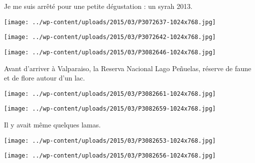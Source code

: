   Je me suis arrêté pour une petite dégustation : un syrah 2013.
\begin{center} \texttt{[image: ../wp-content/uploads/2015/03/P3072637-1024x768.jpg]} \end{center}
\begin{center} \texttt{[image: ../wp-content/uploads/2015/03/P3072642-1024x768.jpg]} \end{center}
\begin{center} \texttt{[image: ../wp-content/uploads/2015/03/P3082646-1024x768.jpg]} \end{center}

\pagebreak
Avant d'arriver à Valparaiso, la Reserva Nacional Lago Peñuelas, réserve de faune et de flore autour d'un lac. 
\begin{center} \texttt{[image: ../wp-content/uploads/2015/03/P3082661-1024x768.jpg]} \end{center}
\begin{center} \texttt{[image: ../wp-content/uploads/2015/03/P3082659-1024x768.jpg]} \end{center}

\pagebreak
 Il y avait même quelques lamas. 
\begin{center} \texttt{[image: ../wp-content/uploads/2015/03/P3082653-1024x768.jpg]} \end{center}
\begin{center} \texttt{[image: ../wp-content/uploads/2015/03/P3082656-1024x768.jpg]} \end{center}
